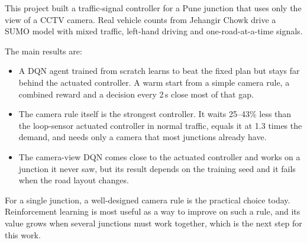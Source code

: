 This project built a traffic-signal controller for a Pune junction that uses only the view of a
CCTV camera. Real vehicle counts from Jehangir Chowk drive a SUMO model with mixed traffic,
left-hand driving and one-road-at-a-time signals.

The main results are:
\begin{itemize}
  \item A DQN agent trained from scratch learns to beat the fixed plan but stays far behind the
        actuated controller. A warm start from a simple camera rule, a combined reward and a
        decision every 2\,s close most of that gap.
  \item The camera rule itself is the strongest controller. It waits 25--43\% less than the
        loop-sensor actuated controller in normal traffic, equals it at 1.3 times the demand, and
        needs only a camera that most junctions already have.
  \item The camera-view DQN comes close to the actuated controller and works on a junction it never
        saw, but its result depends on the training seed and it fails when the road layout
        changes.
\end{itemize}

For a single junction, a well-designed camera rule is the practical choice today. Reinforcement
learning is most useful as a way to improve on such a rule, and its value grows when several
junctions must work together, which is the next step for this work.
